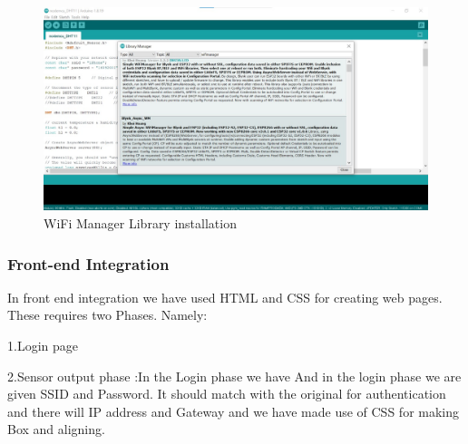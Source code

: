 \documentclass[12pt,a4paper,twocolumn,fleqn]{article}
\begin{document}
\begin{figure} [H]
\includegraphics[width=17cm]{media/lib (3).jpeg}
\centering
\caption{WiFi Manager Library installation }
\end{figure}
\subsubsection{Front-end Integration}
In front end integration we have used HTML and CSS for creating web pages.
These requires two Phases. Namely:

1.Login page

2.Sensor output phase :In the Login phase we have And in the login phase we are given SSID and Password. It should match with the original for authentication and there will IP address and Gateway and we have made use of CSS for making Box and aligning.

\newpage
  \pagestyle{fancy}
  \thispagestyle{empty}
  \thispagestyle{plain}
  \fancyhf{}
  \chead{}
\renewcommand{\footrulewidth}{0.4pt}%
\normalsize
\end{document}
